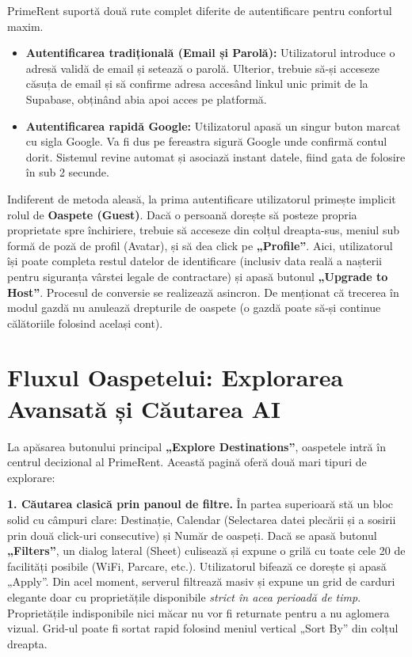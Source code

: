\documentclass[12pt,a4paper,oneside]{report}
\begin{document}
PrimeRent suportă două rute complet diferite de autentificare pentru confortul maxim.
\begin{itemize}
    \item \textbf{Autentificarea tradițională (Email și Parolă):} Utilizatorul introduce o adresă validă de email și setează o parolă. Ulterior, trebuie să-și acceseze căsuța de email și să confirme adresa accesând linkul unic primit de la Supabase, obținând abia apoi acces pe platformă.
    \item \textbf{Autentificarea rapidă Google:} Utilizatorul apasă un singur buton marcat cu sigla Google. Va fi dus pe fereastra sigură Google unde confirmă contul dorit. Sistemul revine automat și asociază instant datele, fiind gata de folosire în sub 2 secunde.
\end{itemize}

Indiferent de metoda aleasă, la prima autentificare utilizatorul primește implicit rolul de \textbf{Oaspete (Guest)}.
Dacă o persoană dorește să posteze propria proprietate spre închiriere, trebuie să acceseze din colțul dreapta-sus, meniul sub formă de poză de profil (Avatar), și să dea click pe \textbf{„Profile''}. Aici, utilizatorul își poate completa restul datelor de identificare (inclusiv data reală a nașterii pentru siguranța vârstei legale de contractare) și apasă butonul \textbf{„Upgrade to Host''}. Procesul de conversie se realizează asincron. De menționat că trecerea în modul gazdă nu anulează drepturile de oaspete (o gazdă poate să-și continue călătoriile folosind același cont).

\section{Fluxul Oaspetelui: Explorarea Avansată și Căutarea AI}

La apăsarea butonului principal \textbf{„Explore Destinations''}, oaspetele intră în centrul decizional al PrimeRent. Această pagină oferă două mari tipuri de explorare:

\textbf{1. Căutarea clasică prin panoul de filtre.} 
În partea superioară stă un bloc solid cu câmpuri clare: Destinație, Calendar (Selectarea datei plecării și a sosirii prin două click-uri consecutive) și Număr de oaspeți. Dacă se apasă butonul \textbf{„Filters''}, un dialog lateral (Sheet) culisează și expune o grilă cu toate cele 20 de facilități posibile (WiFi, Parcare, etc.). Utilizatorul bifează ce dorește și apasă „Apply''. Din acel moment, serverul filtrează masiv și expune un grid de carduri elegante doar cu proprietățile disponibile \textit{strict în acea perioadă de timp}. Proprietățile indisponibile nici măcar nu vor fi returnate pentru a nu aglomera vizual. Grid-ul poate fi sortat rapid folosind meniul vertical „Sort By'' din colțul dreapta.
\end{document}

